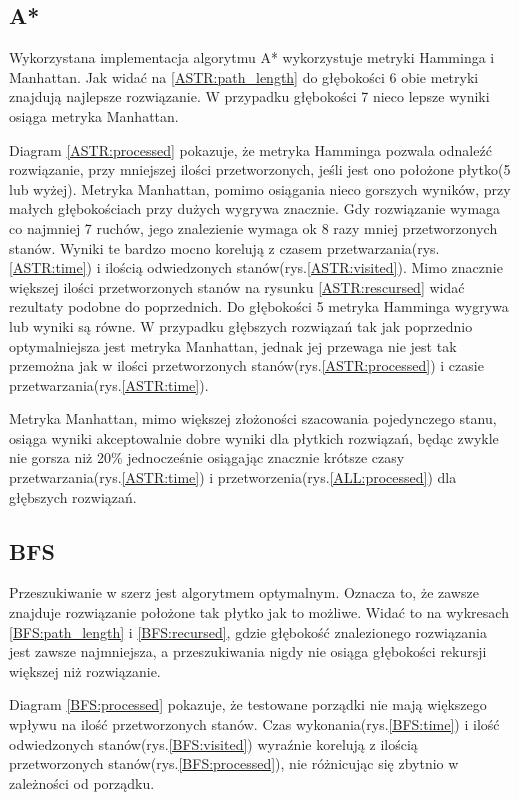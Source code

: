 \documentclass{classrep}
\begin{document}
\subsection{A*}
Wykorzystana implementacja algorytmu A* wykorzystuje metryki Hamminga i Manhattan.
Jak widać na \ref{ASTR:path_length} do głębokości 6 obie metryki znajdują najlepsze rozwiązanie.
W przypadku głębokości 7 nieco lepsze wyniki osiąga metryka Manhattan.

Diagram \ref{ASTR:processed} pokazuje, że metryka Hamminga pozwala odnaleźć rozwiązanie, przy mniejszej ilości przetworzonych, jeśli jest ono położone płytko(5 lub wyżej).
Metryka Manhattan, pomimo osiągania nieco gorszych wyników, przy małych głębokościach przy dużych wygrywa znacznie.
Gdy rozwiązanie wymaga co najmniej 7 ruchów, jego znalezienie wymaga ok 8 razy mniej przetworzonych stanów.
Wyniki te bardzo mocno korelują z czasem przetwarzania(rys.\ref{ASTR:time}) i ilością odwiedzonych stanów(rys.\ref{ASTR:visited}).
Mimo znacznie większej ilości przetworzonych stanów na rysunku \ref{ASTR:rescursed} widać rezultaty podobne do poprzednich.
Do głębokości 5 metryka Hamminga wygrywa lub wyniki są równe.
W przypadku głębszych rozwiązań tak jak poprzednio optymalniejsza jest metryka Manhattan, jednak jej przewaga nie jest tak przemożna jak w ilości przetworzonych stanów(rys.\ref{ASTR:processed}) i czasie przetwarzania(rys.\ref{ASTR:time}).

Metryka Manhattan, mimo większej złożoności szacowania pojedynczego stanu, osiąga wyniki akceptowalnie dobre wyniki dla płytkich rozwiązań, będąc zwykle nie gorsza niż 20\% jednocześnie osiągając znacznie krótsze czasy przetwarzania(rys.\ref{ASTR:time}) i przetworzenia(rys.\ref{ALL:processed}) dla głębszych rozwiązań.  

\subsection{BFS}
Przeszukiwanie w szerz jest algorytmem optymalnym.
Oznacza to, że zawsze znajduje rozwiązanie położone tak płytko jak to możliwe.
Widać to na wykresach \ref{BFS:path_length} i \ref{BFS:recursed}, gdzie głębokość znalezionego rozwiązania jest zawsze najmniejsza, a przeszukiwania nigdy nie osiąga głębokości rekursji większej niż rozwiązanie.

Diagram \ref{BFS:processed} pokazuje, że testowane porządki nie mają większego wpływu na ilość przetworzonych stanów.
Czas wykonania(rys.\ref{BFS:time}) i ilość odwiedzonych stanów(rys.\ref{BFS:visited}) wyraźnie korelują z ilością przetworzonych stanów(rys.\ref{BFS:processed}), nie różnicując się zbytnio w zależności od porządku.
\end{document}
